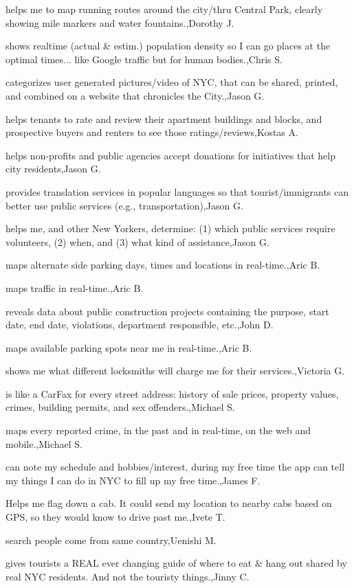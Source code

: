 \documentclass{article}
\begin{document}
helps me to map running routes around the city/thru Central Park, clearly showing mile markers and water fountains.,Dorothy J.

shows realtime (actual \& estim.) population density so I can go places at the optimal times... like Google traffic but for human bodies.,Chris S.

categorizes user generated pictures/video of NYC, that can be shared, printed, and combined on a website that chronicles the City.,Jason G.

helps tenants to rate and review their apartment buildings and blocks, and prospective buyers and renters to see those ratings/reviews,Kostas A.

helps non-profits and public agencies accept donations for initiatives that help city residents,Jason G.

provides translation services in popular languages so that tourist/immigrants can better use public services (e.g., transportation),Jason G.

helps me, and other New Yorkers, determine: (1) which public services require volunteers, (2) when, and (3) what kind of assistance,Jason G.

maps alternate side parking days, times and locations in real-time.,Aric B.

maps traffic in real-time.,Aric B.

reveals data about public construction projects containing the purpose, start date, end date, violations, department responsible, etc.,John D.

maps available parking spots near me in real-time.,Aric B.

shows me what different locksmiths will charge me for their services.,Victoria G.

is like a CarFax for every street address: history of sale prices, property values, crimes, building permits, and sex offenders.,Michael S.

maps every reported crime, in the past and in real-time, on the web and mobile.,Michael S.

can note my schedule and hobbies/interest, during my free time the app can tell my things I can do in NYC to fill up my free time.,James F.

Helps me flag down a cab. It could send my location to nearby cabs based on GPS, so they would know to drive past me.,Ivete T.

search people come from same country,Uenishi M.

gives tourists a REAL ever changing guide of where to eat \& hang out shared by real NYC residents. And not the touristy things.,Jinny C.
\end{document}
